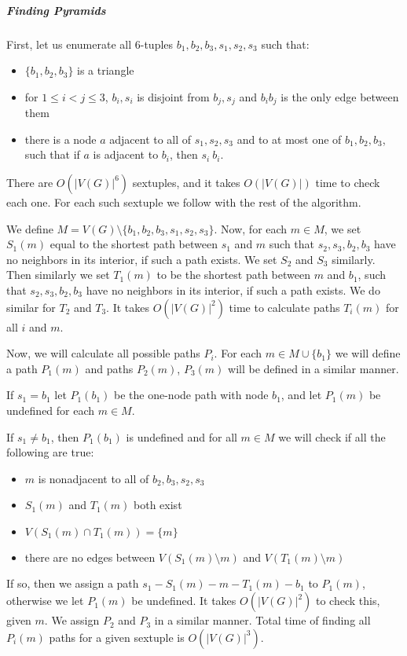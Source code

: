 \documentclass{article}
\begin{document}
\subparagraph{Finding Pyramids}

First, let us enumerate all 6-tuples $b_1, b_2, b_3, s_1, s_2, s_3$ such that:
\begin{itemize}
	\item $\{b_1, b_2, b_3\}$ is a triangle
	\item for $1 \leq i < j \leq 3$, ${b_i, s_i}$ is disjoint from ${b_j, s_j}$ and $b_ib_j$ is the only edge between them
	\item there is a node $a$ adjacent to all of $s_1, s_2, s_3$ and to at most one of $b_1, b_2, b_3$, such that if $a$ is adjacent to $b_i$, then $s_i \ b_i$.
\end{itemize}

There are $O(|V(G)|^6)$ sextuples, and it takes $O(|V(G)|)$ time to check each one. For each such sextuple we follow with the rest of the algorithm. 

We define $M = V(G) \setminus \{b_1, b_2, b_3, s_1, s_2, s_3\}$. Now, for each $m \in M$, we set $S_1(m)$ equal to the shortest path between $s_1$ and $m$ such that $s_2, s_3, b_2, b_3$ have no neighbors in its interior, if such a path exists. We set $S_2$ and $S_3$ similarly. Then similarly we set $T_1(m)$ to be the shortest path between $m$ and $b_1$, such that $s_2, s_3, b_2, b_3$ have no neighbors in its interior, if such a path exists. We do similar for $T_2$ and $T_3$. It takes $O(|V(G)|^2)$ time to calculate paths $T_i(m)$ for all $i$ and $m$.

Now, we will calculate all possible paths $P_i$. For each $m \in M \cup \{b_1\}$ we will define a path $P_1(m)$ and paths $P_2(m)$, $P_3(m)$ will be defined in a similar manner.

If $s_1 = b_1$ let $P_1(b_1)$ be the one-node path with node $b_1$, and let $P_1(m)$ be undefined for each $m \in M$.

If $s_1 \neq b_1$, then $P_1(b_1)$ is undefined and for all $m \in M$ we will check if all the following are true:
\begin{itemize}
	\item $m$ is nonadjacent to all of $b_2, b_3, s_2, s_3$
	\item $S_1(m)$ and $T_1(m)$ both exist
	\item $V(S_1(m) \cap T_1(m)) = \{m\}$
	\item there are no edges between $V(S_1(m) \setminus m)$ and $V(T_1(m) \setminus m)$
\end{itemize}
If so, then we assign a path $s_1-S_1(m)-m-T_1(m)-b_1$ to $P_1(m)$, otherwise we let $P_1(m)$ be undefined. It takes $O(|V(G)|^2)$ to check this, given $m$. We assign $P_2$ and $P_3$ in a similar manner. Total time of finding all $P_i(m)$ paths for a given sextuple is $O(|V(G)|^3)$.
\end{document}
